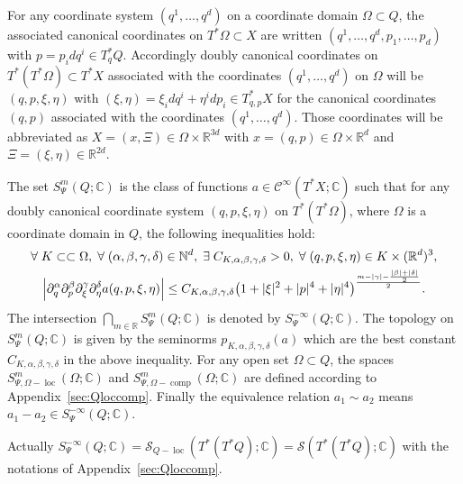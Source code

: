 \documentclass[AHL,Unicode,longabstracts]{cedram}
\newcommand{\C}{\mathbb{C}}
\newcommand{\R}{\mathbb{R}}
\newcommand{\N}{\mathbb{N}}
\newcommand{\clC}{\mathcal{C}}
\newcommand{\clS}{\mathcal{S}}
\DeclareMathOperator{\ccomp}{comp}
\DeclareMathOperator{\locc}{loc}
\let\oldexists\exists
\renewcommand*{\exists}{\mathrel{\oldexists}}
\let\oldforall\forall
\renewcommand*{\forall}{\mathrel{\oldforall}}
\let\originalleft\left
\let\originalright\right
\renewcommand{\left}{\mathopen{}\mathclose\bgroup\originalleft}
\renewcommand{\right}{\aftergroup\egroup\originalright}
\begin{document}
\begin{defi}\label{de:doubcancoord}
For any coordinate system $(q^{1},\dots, q^{d})$ on a coordinate domain $\Omega\subset Q$, the associated canonical coordinates on $T^{*}\Omega\subset X$ are written $(q^{1},\dots,q^{d},p_{1},\dots,p_{d})$ with $p=p_{i}dq^{i}\in T^{*}_{q}Q$. Accordingly doubly canonical coordinates on $T^{*}(T^{*}\Omega)\subset T^{*}X$ associated with the coordinates $(q^{1},\dots,q^{d})$ on $\Omega$ will be $(q,p,\xi,\eta)$ with $(\xi,\eta)=\xi_{i}dq^{i}+\eta^{i}dp_{i}\in T^{*}_{q,p}X$ for the canonical coordinates $(q,p)$ associated with the coordinates $(q^{1},\dots,q^{d})$. Those coordinates will be abbreviated as $X=(x,\Xi)\in \Omega\times\R^{3d}$ with $x=(q,p)\in \Omega\times \R^{d}$ and $\Xi=(\xi,\eta)\in \R^{2d}$.
\end{defi}

\begin{defi}\label{de:symbol}
The set $S^{m}_{\Psi}(Q;\C)$ is the class of functions $a\in \clC^{\infty}(T^{*}X;\C)$ such that for any doubly canonical coordinate system $(q,p,\xi,\eta)$ on $T^{*}(T^{*}\Omega)$, where $\Omega$ is a coordinate domain in $Q$, the following inequalities hold:
\begin{multline}\label{eq:Sloc}
\forall K\subset\subset \Omega,\;\forall (\alpha,\beta,\gamma,\delta)\in \N^{d},\;\exists C_{K,\alpha,\beta,\gamma,\delta}>0,\;\forall (q,p,\xi,\eta)\in K\times (\R^{d})^{3},\\
\left|\partial_{q}^{\alpha}\partial_{p}^{\beta}\partial_{\xi}^{\gamma}\partial_{\eta}^{\delta}a(q,p,\xi,\eta)\right|\leq C_{K,\alpha,\beta,\gamma,\delta}\left(1+|\xi|^{2}+|p|^{4}+|\eta|^{4}\right)^{\frac{m-|\gamma|-\frac{|\beta|+|\delta|}{2}}{2}}.
\end{multline}
The intersection $\bigcap_{m\in \R}S^{m}_{\Psi}(Q;\C)$ is denoted by $S^{-\infty}_{\Psi}(Q;\C)$. The topology on $S^{m}_{\Psi}(Q;\C)$ is given by the seminorms $p_{K,\alpha,\beta,\gamma,\delta}(a)$ which are the best constant $C_{K,\alpha,\beta,\gamma,\delta}$ in the above inequality. For any open set $\Omega\subset Q$, the spaces $S^{m}_{\Psi,\Omega-\locc}(\Omega;\C)$ and $S^{m}_{\Psi, \Omega-\ccomp}(\Omega;\C)$ are defined according to Appendix~\ref{sec:Qloccomp}. Finally the equivalence relation $a_{1}\sim a_{2}$ means $a_{1}-a_{2}\in S^{-\infty}_{\Psi}(Q;\C)$.
\end{defi}

Actually $S^{-\infty}_{\Psi}(Q;\C)=\clS_{Q-\locc}(T^{*}(T^{*}Q);\C)=\clS(T^{*}(T^{*}Q);\C)$ with the notations of Appendix~\ref{sec:Qloccomp}.
\end{document}
